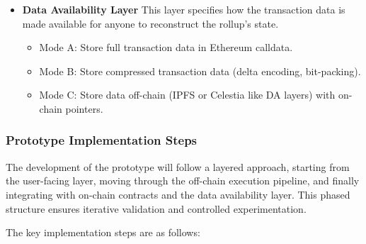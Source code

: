 \begin{itemize}
\begin{itemize}
        \item \textbf{Verifier.sol}
            \begin{itemize}
                \item Verifies zkSNARK/STARK proofs submitted by the off-chain prover.
                \item Enforces correctness of all rollup state transitions.
            \end{itemize}
    \end{itemize}
    
    \item \textbf{Data Availability Layer}
    This layer specifies how the transaction data is made available for anyone to reconstruct the rollup's state.
    \begin{itemize}
        \item {Mode A:} Store full transaction data in Ethereum calldata.
        \item {Mode B:} Store compressed transaction data (delta encoding, bit-packing).
        \item {Mode C:} Store data off-chain (IPFS \cite{protocol_ipfs} or Celestia \cite{celestia_how } like DA layers) with on-chain pointers.
    \end{itemize}
\end{itemize}


\subsubsection{Prototype Implementation Steps}

The development of the prototype will follow a layered approach, starting from the user-facing layer, moving through the off-chain execution pipeline, and finally integrating with on-chain contracts and the data availability layer. This phased structure ensures iterative validation and controlled experimentation.

The key implementation steps are as follows:

